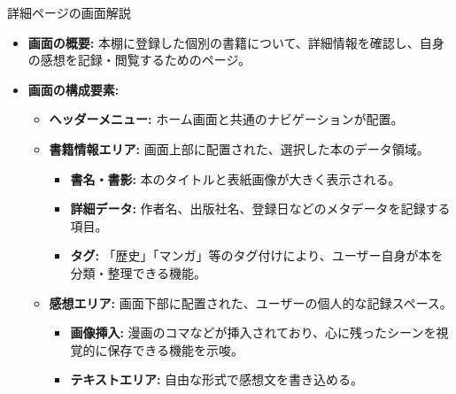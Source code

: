 \documentclass[a4paper, 11pt, titlepage]{jsarticle}
\begin{document}
詳細ページの画面解説

\begin{itemize}
    \item \textbf{画面の概要:}
    本棚に登録した個別の書籍について、詳細情報を確認し、自身の感想を記録・閲覧するためのページ。

    \item \textbf{画面の構成要素:}
    \begin{itemize}
        \item \textbf{ヘッダーメニュー:} ホーム画面と共通のナビゲーションが配置。
        \item \textbf{書籍情報エリア:} 画面上部に配置された、選択した本のデータ領域。
        \begin{itemize}
            \item \textbf{書名・書影:} 本のタイトルと表紙画像が大きく表示される。
            \item \textbf{詳細データ:} 作者名、出版社名、登録日などのメタデータを記録する項目。
            \item \textbf{タグ:} 「歴史」「マンガ」等のタグ付けにより、ユーザー自身が本を分類・整理できる機能。
        \end{itemize}

        \item \textbf{感想エリア:} 画面下部に配置された、ユーザーの個人的な記録スペース。
        \begin{itemize}
            \item \textbf{画像挿入:} 漫画のコマなどが挿入されており、心に残ったシーンを視覚的に保存できる機能を示唆。
            \item \textbf{テキストエリア:} 自由な形式で感想文を書き込める。
        \end{itemize}
    \end{itemize}
\end{itemize}
\clearpage
\end{document}
